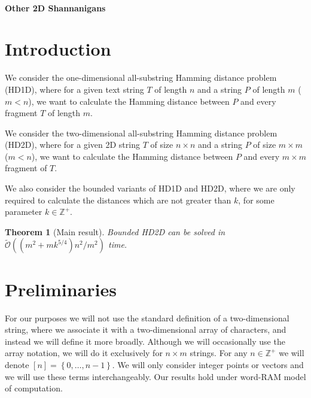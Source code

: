 \documentclass[11pt]{article}
\newcommand{\Z}{\mathbb{Z}}
\newcommand{\tO}{\tilde{\mathcal{O}}}
\newcommand{\set}[1]{\left\lbrace #1 \right\rbrace}
\theoremstyle{plain}
\newtheorem{theorem}{Theorem}
\theoremstyle{definition}
\theoremstyle{remark}
\newcommand{\jonas}[2][]{\todo[color=green!40, #1]{\textbf{J:} #2}}
\newcommand{\jonasi}[2][]{\jonas[inline, #1]{#2}}
\begin{document}
\paragraph{Other 2D Shannanigans}

\jonasi{work in progress, unfinished $\uparrow$}

\section{Introduction}

\newcommand{\hd}{\textsc{HD1D}\xspace}
\newcommand{\HD}{\textsc{HD2D}\xspace}

We consider the one-dimensional all-substring Hamming distance problem (\hd), where for a given text string $T$ of length $n$ and a string $P$ of length $m$ ($m < n$), we want to calculate the Hamming distance between $P$ and every fragment $T$ of length $m$.

We consider the two-dimensional all-substring Hamming distance problem (\HD), where for a given 2D string $T$ of size $n \times n$ and a string $P$ of size $m \times m$ ($m < n$), we want to calculate the Hamming distance between $P$ and every $m \times m$ fragment of $T$.

We also consider the bounded variants of \hd and \HD, where we are only required to calculate the distances which are not greater than $k$, for some parameter $k \in \Z^+$.


\begin{theorem}[Main result]\label{main result}
	Bounded \HD can be solved in $\tO((m^2 + mk^{5/4})n^2 / m^2)$ time.
\end{theorem}


\section{Preliminaries}

For our purposes we will not use the standard definition of a two-dimensional string, where we associate it with a two-dimensional array of characters, and instead we will define it more broadly.
Although we will occasionally use the array notation, we will do it exclusively for $n \times m$ strings.
For any $n \in \Z^+$ we will denote $[n] = \set{0, \dots, n - 1}$.
We will only consider integer points or vectors and we will use these terms interchangeably.
Our results hold under word-RAM model of computation.
\end{document}
